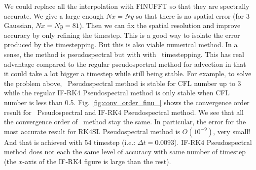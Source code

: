 \documentclass[11pt,letterpaper]{article}
\begin{document}
We could replace all the interpolation with FINUFFT so that they are spectrally accurate. We give a large enough $Nx = Ny$ so that there is no spatial error (for 3 Gaussian, $Nx = Ny = 81$). Then we can fix the spatial resolution and improve accuracy by only refining the timestep. This is a good way to isolate the error produced by the timestepping. But this is also viable numerical method. In a sense, the method is pseudospectral but with with \sml\ timestepping. This has real advantage compared to the regular pseudospectral method for advection in that it could take a lot bigger a timestep while still being stable. For example, to solve the problem above, \sml\ Pseudospectral method is stable for CFL number up to 3 while the regular IF-RK4 Pseudospectral method is only stable when CFL number is less than 0.5. Fig. \ref{fig:conv_order_finu_} shows the convergence order result for \sml\ Pseudospectral and IF-RK4 Pseudospectral method. We see that all the convergence order of \sml\ method stay the same. In particular, the error for the most accurate result for RK4SL Pseudospectral method is $O(10^{-9})$, very small! And that is achieved with 54 timestep (i.e.: $\Delta t = 0.0093$). IF-RK4 Pseudospectral method does not each the same level of accuracy with same number of timestep (the $x$-axis of the IF-RK4 figure is large than the rest).
\end{document}

